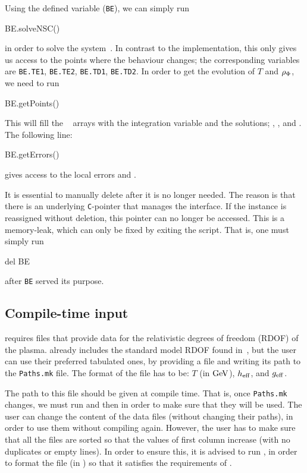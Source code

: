 \documentclass[11pt,a4paper]{article}
\begin{document}
Using the defined variable ({\tt BE}), we can simply run  
%
\begin{py}
	BE.solveNSC()
\end{py}
%
in order to solve the system~. In contrast to the \CPP implementation, this only gives us access to the points where the behaviour changes; the corresponding variables are  {\tt BE.TE1}, {\tt BE.TE2}, {\tt BE.TD1}, {\tt BE.TD2}. In order to get the evolution of $T$ and $\rho_{\Phi}$, we need to run 
%
\begin{py}
	BE.getPoints()
\end{py}
%
This will fill the ~\cite{harris2020array} arrays with the integration variable and the solutions; , , and . The following line:
%
\begin{py}
	BE.getErrors()
\end{py}
%
gives access to the local errors  and .

It is essential to manually delete  after it is no longer needed. The reason is that there is an underlying {\tt C}-pointer that manages the \PY interface. If the instance is reassigned without deletion, this pointer can no longer be accessed. This is a memory-leak, which can only be fixed by exiting the script. 
%
That is, one must simply run 
%
\begin{py}
	del BE
\end{py}  
%
after {\tt BE} served its purpose.


\subsection{Compile-time input}\label{sec:compile_time_input} 
%
\nsc requires files that provide data for the relativistic degrees of freedom (RDOF) of the plasma. \nsc already includes the standard model RDOF found in~\cite{Saikawa:2020swg,Hindmarsh:2005ix}, but the user can use their preferred tabulated ones, by providing a file and writing its path to the {\tt Paths.mk} file. The format of the file has to be: $T$ (in ${\rm GeV}$), $h_{\rm eff}{}$, and $g_{\rm eff}{}$.

The path to this file should be given at compile time. That is, once {\tt Paths.mk} changes, we must run  and then  in order to make sure that they will be used. The user can change the content of the data files (without changing their paths), in order to use them without compiling \nsc again. However, the user has to make sure that all the files are sorted so that the values of first column increase (with no duplicates or empty lines). In order to ensure this, it is advised to run , in order to format the file (in ) so that it satisfies the requirements of \nsc.
\end{document}
